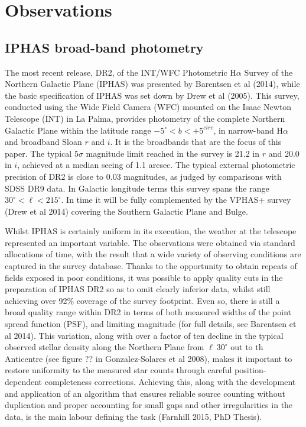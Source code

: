\documentclass[a4paper,useAMS,usenatbib]{mn2e}
\begin{document}
\section[]{Observations}

\subsection{IPHAS broad-band photometry}

The most recent release, DR2, of the INT/WFC Photometric H$\alpha$ Survey of the Northern Galactic Plane (IPHAS) was 
presented by Barentsen et al (2014), while the basic specification of IPHAS was set down by Drew et al (2005).  This 
survey, conducted using the Wide Field Camera (WFC) mounted on the Isaac Newton Telescope (INT) in La Palma, provides 
photometry of the complete Northern Galactic Plane within the latitude range $-5^{\circ} < b < +5^{circ}$, in narrow-band 
H$\alpha$ and broadband Sloan $r$ and $i$.  It is the broadbands that are the focus of this paper.  The typical 
$5\sigma$ magnitude limit reached in the survey is 21.2 in $r$ and 20.0 in $i$, achieved at a median seeing of 1.1 arcsec.  
The typical external photometric precision of DR2 is close to 0.03 magnitudes, as judged by comparisons with SDSS DR9 
data.  In Galactic longitude terms this survey spans the range $30^{\circ} < \ell < 215^{\circ}$.  In time it will be 
fully complemented by the VPHAS+ survey (Drew et al 2014) covering the Southern Galactic Plane and Bulge.  

Whilst IPHAS is certainly uniform in its execution, the weather at the telescope represented an important variable.  The 
observations were obtained via standard allocations of time, with the result that a wide variety of observing conditions 
are captured in the survey database.  Thanks to the opportunity to obtain repeats of fields exposed in poor conditions, it 
was possible to apply quality cuts in the preparation of IPHAS DR2 so as to omit clearly inferior data, whilst still 
achieving over 92\% coverage of the survey footprint.  Even so, there is still a broad quality range within DR2 in terms 
of both measured widths of the point spread function (PSF), and limiting magnitude (for full details, see Barentsen et al 
2014).  This variation, along with over a factor of ten decline in the typical observed stellar density along the Northern 
Plane from $\ell ~ 30^{\circ}$ out to th Anticentre (see figure ?? in Gonzalez-Solares et al 2008), makes it important to 
restore uniformity to the measured star counts through careful position-dependent completeness corrections.  Achieving 
this, along with the development and application of an algorithm that ensures reliable source 
counting without duplication and proper accounting for small gaps and other irregularities in the data, is the main 
labour defining the task (Farnhill 2015, PhD Thesis).
\end{document}
